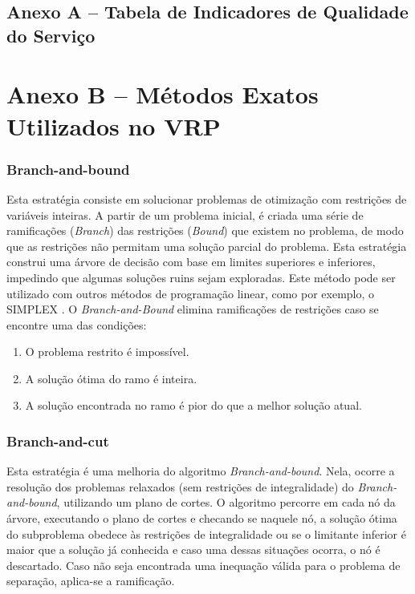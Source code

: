 \section*{Anexo A -- Tabela de Indicadores de Qualidade do Serviço}
\label{anexo-tabela-indicadores}


\chapter*{Anexo B -- Métodos Exatos Utilizados no VRP}
\label{anexo-metodos-exatos}
\subsection*{Branch-and-bound}
Esta estratégia consiste em solucionar problemas de otimização com restrições de variáveis inteiras. A partir de um problema inicial, é criada uma série de ramificações (\emph{Branch}) das restrições (\emph{Bound}) que existem no problema, de modo que as restrições não permitam uma solução parcial do problema. Esta estratégia construi uma árvore de decisão com base em limites superiores e inferiores, impedindo que algumas soluções ruins sejam exploradas. Este método pode ser utilizado com outros métodos de programação linear, como por exemplo, o SIMPLEX \cite{LAPORTE1992345}. O \emph{Branch-and-Bound} elimina ramificações de restrições caso se encontre uma das condições:

\begin{enumerate}
    \item O problema restrito é impossível.
    \item A solução ótima do ramo é inteira.
    \item A solução encontrada no ramo é pior do que a melhor solução atual.
\end{enumerate}

\subsection*{Branch-and-cut}
Esta estratégia é uma melhoria do algoritmo \emph{Branch-and-bound}. Nela, ocorre a resolução dos problemas relaxados (sem restrições de integralidade) do \emph{Branch-and-bound}, utilizando um plano de cortes. O algoritmo percorre em cada nó da árvore, executando o plano de cortes e checando se naquele nó, a solução ótima do subproblema obedece às restrições de integralidade ou se o limitante inferior é maior que a solução já conhecida e caso uma dessas situações ocorra, o nó é descartado. Caso não seja encontrada uma inequação válida para o problema de separação, aplica-se a ramificação.

